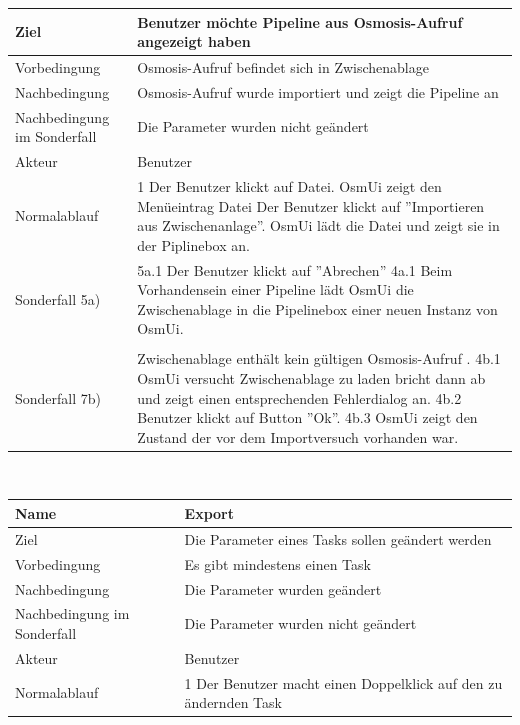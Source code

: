 \documentclass[a4paper,12pt]{scrartcl}
\begin{document}
\begin{center}
\begin{tabular}{|p{5cm}|p{10cm}|}
\hline Ziel & Benutzer möchte Pipeline aus Osmosis-Aufruf angezeigt haben\\ 
\hline Vorbedingung & Osmosis-Aufruf befindet sich in Zwischenablage\\ 
\hline Nachbedingung & Osmosis-Aufruf wurde importiert und zeigt die Pipeline an \\  
\hline Nachbedingung im Sonderfall & Die Parameter wurden nicht geändert\\
\hline Akteur & Benutzer \\ 
\hline Normalablauf & 1 Der Benutzer klickt auf Datei.
\newline 
2 OsmUi zeigt den Menüeintrag Datei
\newline
3 Der Benutzer klickt auf ''Importieren aus Zwischenanlage''.
\newline
4 OsmUi lädt die Datei und zeigt sie in der Piplinebox an.
\\ 
\hline Sonderfall 5a) & 5a.1 Der Benutzer klickt auf ''Abrechen''
\newline
4a.1 Beim Vorhandensein einer Pipeline lädt OsmUi die Zwischenablage in die Pipelinebox einer neuen Instanz von OsmUi.\\\\
\hline Sonderfall 7b)& Zwischenablage enthält kein gültigen Osmosis-Aufruf .
\newline
 4b.1 OsmUi versucht Zwischenablage zu laden bricht dann ab und zeigt einen entsprechenden Fehlerdialog an.
\newline
 4b.2 Benutzer klickt auf Button ''Ok''.
\newline
 4b.3 OsmUi zeigt den Zustand der vor dem Importversuch vorhanden war.
\\
\hline 
\end{tabular} 
\vspace{0.7cm}
\\
\begin{tabular}{|p{5cm}|p{10cm}|}
\hline Name & \textbf{Export} \\ 
\hline Ziel & Die Parameter eines Tasks sollen geändert werden\\ 
\hline Vorbedingung & Es gibt mindestens einen Task\\ 
\hline Nachbedingung & Die Parameter wurden geändert \\  
\hline Nachbedingung im Sonderfall & Die Parameter wurden nicht geändert\\
\hline Akteur & Benutzer \\ 
\hline Normalablauf & 1 Der Benutzer macht einen Doppelklick auf den zu ändernden Task

\end{tabular}
\end{center}
\end{document}
